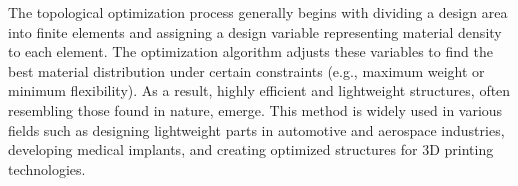 The topological optimization process generally begins with dividing a design area into finite elements and assigning a design variable representing material density to each element. The optimization algorithm adjusts these variables to find the best material distribution under certain constraints (e.g., maximum weight or minimum flexibility). As a result, highly efficient and lightweight structures, often resembling those found in nature, emerge. This method is widely used in various fields such as designing lightweight parts in automotive and aerospace industries, developing medical implants, and creating optimized structures for 3D printing technologies. 